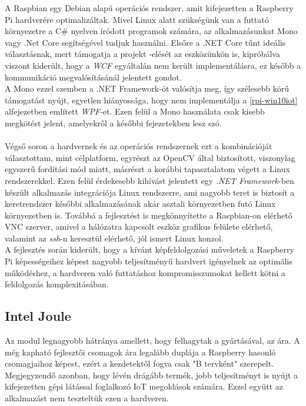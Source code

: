 A Raspbian egy Debian alapú operációs rendszer, amit kifejezetten a Raspberry Pi hardverére optimalizáltak. Mivel Linux alatt szükségünk van a futtató környezetre a C\# nyelven íródott programok számára, az alkalmazásunkat Mono vagy .Net Core segítségével tudjuk használni. Elsőre a .NET Core tűnt ideális választásnak, mert támogatja a projekt -elését az eszközünkön is, kipróbálva viszont kiderült, hogy a \emph{WCF} egyáltalán nem került implementálásra, ez később a kommunikáció megvalósításánál jelentett gondot. \\
A Mono ezzel szemben a .NET Framework-öt valósítja meg, így szélesebb körű támogatást nyújt, egyetlen hiányossága, hogy nem implementálja a \ref{rpi-win10iot} alfejezetben említett \emph{WPF}-et. Ezen felül a Mono használata csak kisebb megkötést jelent, amelyekről a későbbi fejezetekben lesz szó.\\
\\
Végső soron a hardvernek és az operációs rendszernek ezt a kombinációját választottam, mint célplatform, egyrészt az OpenCV által biztosított, viszonylag egyszerű fordítási mód miatt, másrészt a korábbi tapasztalatom végett a Linux rendszerekkel. Ezen felül érdekesebb kihívást jelentett egy \textit{.NET Framework}-ben készült alkalmazás integrációja Linux rendszerre, ami nagyobb teret is biztosít a keretrendszer későbbi alkalmazásának akár asztali környezetben futó Linux környezetben is. Továbbá a fejlesztést is megkönnyítette a Raspbian-on elérhető VNC szerver, amivel a hálózatra kapcsolt eszköz grafikus felülete elérhető, valamint az \emph{ssh}-n keresztül elérhető, jól ismert Linux konzol.\\
A fejlesztés során kiderült, hogy a kívánt képfeldolgozási műveletek a Raspberry Pi képességeihez képest nagyobb teljesítményű hardvert igényelnek az optimális működéshez, a hardveren való futtatáshoz kompromisszumokat kellett kötni a feldolgozás komplexitásában.

\subsection{Intel Joule}

Az modul legnagyobb hátránya amellett, hogy felhagytak a gyártásával, az ára. A még kapható fejlesztői csomagok ára legalább duplája a Raspberry hasonló csomagjaihoz képest, ezért a kezdetektől fogva csak "B tervként" szerepelt. Megjegyzendő azonban, hogy lévén drágább termék, jobb teljesítményt is nyújt a kifejezetten gépi látással foglalkozó IoT megoldások számára. Ezzel együtt az alkalmazást nem teszteltük ezen a hardveren.

